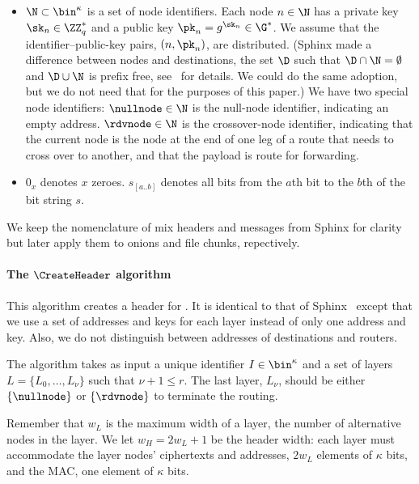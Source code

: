 \begin{itemize}
  \item \(\N\subset \bin^\kappa\) is a set of node identifiers.
    Each node \(n\in \N\) has a private key \(\sk_n\in \ZZ_q^*\) and a public 
    key \(\pk_n = g^{\sk_n}\in \G^*\).
    We assume that the identifier--public-key pairs, \((n, \pk_n)\), are 
    distributed.
    (Sphinx made a difference between nodes and destinations, \ie the set 
    \(\D\) such that \(\D\cap \N = \emptyset\) and \(\D\cup \N\) is prefix 
    free, see~\cite{Sphinx} for details.
    We could do the same adoption, but we do not need that for the purposes of 
    this paper.)
    We have two special node identifiers:
    \(\nullnode\in \N\) is the null-node identifier, indicating an empty 
    address.
    \(\rdvnode\in \N\) is the crossover-node identifier, indicating that the 
    current node is the node at the end of one leg of a route that needs to cross
   over to another, and that the payload is  route 
    for forwarding.

  \item \(0_x\) denotes \(x\) zeroes.
    \(s_{[a..b]}\) denotes all bits from the \(a\)th bit to the \(b\)th of the 
    bit string \(s\).
\end{itemize}

We keep the nomenclature of mix headers and messages from \ac{Sphinx} for
clarity but later apply them to onions and file chunks, repectively.

\paragraph*{The \(\CreateHeader\) algorithm}

This algorithm creates a header for .
It is identical to that of \ac{Sphinx}~\cite[\S 3.2]{Sphinx} except that we use a 
set of addresses and keys for each layer instead of only one address and key.
Also, we do not distinguish between addresses of destinations and routers.

The algorithm takes as input a unique identifier \(I\in \bin^\kappa\) and a set 
of layers \(L = \{L_0, \dotsc, L_\nu\}\) such that \(\nu+1\leq r\).
The last layer, \(L_\nu\), should be either \(\{\nullnode\}\) or 
\(\{\rdvnode\}\) to terminate the routing. 

Remember that \(w_L\) is the maximum width of a layer, \ie the number of 
alternative nodes in the layer.
We let \(w_H = 2w_L+1\) be the header width:
each layer must accommodate the layer nodes' ciphertexts and addresses, \ie  
\(2w_L\) elements of \(\kappa\) bits,
and the \ac{MAC}, \ie one element of \(\kappa\) bits.


